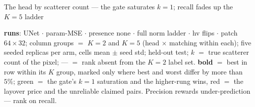\begin{frame}{The head by scatterer count --- the gate saturates $k{=}1$; recall fades up the $K{=}5$ ladder}
  \parbox{0.94\textwidth}{\tiny\color{soft} \textbf{runs}: UNet $\cdot$ param-MSE $\cdot$ presence none $\cdot$ full norm ladder $\cdot$ hv flips $\cdot$ patch $64{\times}32$; column groups $=$ $K{=}2$ and $K{=}5$ (head $\times$ matching within each); five seeded replicas per arm, cells mean $\pm$ seed std; held-out test; $k$ $=$ true scatterer count of the pixel; --- $=$ rank absent from the $K{=}2$ label set. \textbf{bold} $=$ best in row within its $K$ group, marked only where best and worst differ by more than $5\%$; \textcolor{good}{green} $=$ the gate's $k{=}1$ saturation and the higher-rung wins, \textcolor{accent}{red} $=$ the layover price and the unreliable claimed pairs. Precision rewards under-prediction --- rank on recall.\par}
\end{frame}

